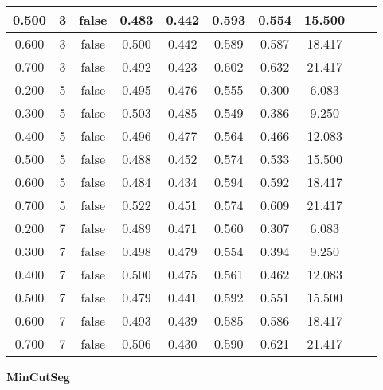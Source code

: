 \documentclass{article}
\begin{document}
\begin{longtable}[c]{|c|c|c|c|c|c|c|c|c|c|}
 0.500 & 3 & false & 0.483 & 0.442 & 0.593 & 0.554 & 15.500  \\ \hline 
 0.600 & 3 & false & 0.500 & 0.442 & 0.589 & 0.587 & 18.417  \\ \hline 
 0.700 & 3 & false & 0.492 & 0.423 & 0.602 & 0.632 & 21.417  \\ \hline 
 0.200 & 5 & false & 0.495 & 0.476 & 0.555 & 0.300 & 6.083  \\ \hline 
 0.300 & 5 & false & 0.503 & 0.485 & 0.549 & 0.386 & 9.250  \\ \hline 
 0.400 & 5 & false & 0.496 & 0.477 & 0.564 & 0.466 & 12.083  \\ \hline 
 0.500 & 5 & false & 0.488 & 0.452 & 0.574 & 0.533 & 15.500  \\ \hline 
 0.600 & 5 & false & 0.484 & 0.434 & 0.594 & 0.592 & 18.417  \\ \hline 
 0.700 & 5 & false & 0.522 & 0.451 & 0.574 & 0.609 & 21.417  \\ \hline 
 0.200 & 7 & false & 0.489 & 0.471 & 0.560 & 0.307 & 6.083  \\ \hline 
 0.300 & 7 & false & 0.498 & 0.479 & 0.554 & 0.394 & 9.250  \\ \hline 
 0.400 & 7 & false & 0.500 & 0.475 & 0.561 & 0.462 & 12.083  \\ \hline 
 0.500 & 7 & false & 0.479 & 0.441 & 0.592 & 0.551 & 15.500  \\ \hline 
 0.600 & 7 & false & 0.493 & 0.439 & 0.585 & 0.586 & 18.417  \\ \hline 
 0.700 & 7 & false & 0.506 & 0.430 & 0.590 & 0.621 & 21.417  \\ \hline 
 \end{longtable} 




 \newpage
{  
\large
\center
	\textbf{MinCutSeg}  

}
\end{document}
